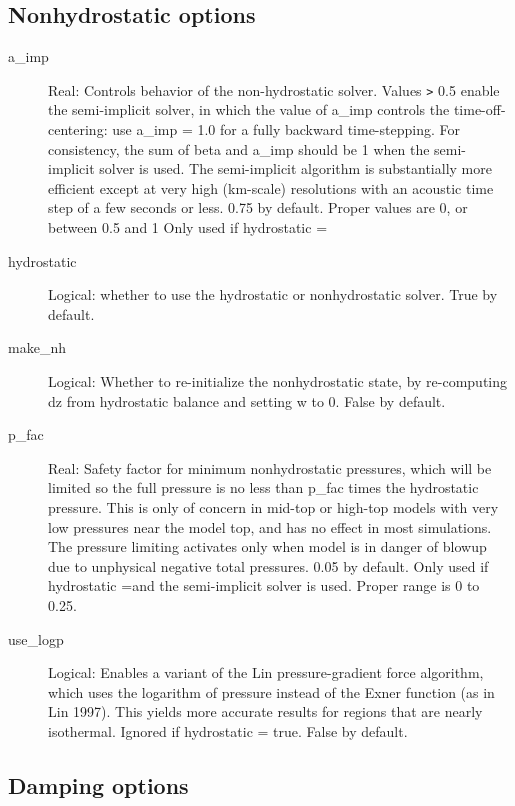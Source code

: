 \documentclass[12pt,letterpaper]{book}
\begin{document}
\subsection{Nonhydrostatic options}

\begin{description}

\item[a\_imp] Real: Controls behavior of the non-hydrostatic solver. Values 
\texttt{>} 0.5 enable the semi-implicit solver, in which the value of a\_imp controls the time-off-centering: use a\_imp 
= 1.0 for a fully backward time-stepping. For consistency, the sum of beta and a\_imp should be 
1 when the semi-implicit solver is used. The semi-implicit algorithm is substantially more efficient except at very high 
(km-scale) resolutions with an acoustic time step of a few seconds or less. 
0.75 by default. Proper values are 0, or between 0.5 and 1 Only used if hydrostatic 
=\false 


\item[hydrostatic] Logical: whether to use the hydrostatic or nonhydrostatic solver. True by default.


\item[make\_nh] Logical: Whether to re-initialize the nonhydrostatic state, by re-computing dz from hydrostatic balance and setting w to 
0. False by default.


\item[p\_fac] Real: Safety factor for minimum nonhydrostatic pressures, which will be limited so the full pressure is no less than p\_fac times the hydrostatic pressure. This is only of concern in mid-top or high-top models with very low pressures near the model top, and has no effect in most simulations. The pressure limiting activates only when model is in danger of blowup due to unphysical negative total pressures. 
0.05 by default. Only used if hydrostatic =\false  and the semi-implicit solver is used. Proper range is 
0 to 0.25.

\item[use\_logp] Logical: Enables a variant of the Lin pressure-gradient force algorithm, which uses the logarithm of pressure instead of the Exner function 
(as in Lin 1997). This yields more accurate results for regions that are nearly isothermal. Ignored if hydrostatic 
= true. False by default.


\end{description}

\subsection{Damping options}
\end{document}
